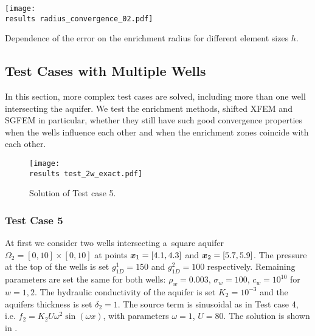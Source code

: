 \begin{graph}[!htb]
  \centering    
  \texttt{[image: \\results radius\_convergence\_02.pdf]}
  \caption[Optimal enrichment radius.]{Dependence of the error on the enrichment radius for different
  element sizes $h$.}
  \label{graph:radius_conv_2}
\end{graph}


\subsection{Test Cases with Multiple Wells}
\label{sec:2d_results_multiple}
In this section, more complex test cases are solved, including more than one well intersecting the aquifer.
We test the enrichment methods, shifted XFEM and SGFEM in particular, whether they
still have such good convergence properties when the wells influence each other and when the enrichment zones coincide with each other.

%
\begin{figure}[!htb]
  \centering    
    \texttt{[image: \\results test\_2w\_exact.pdf]}
  \caption{Solution of Test case 5.}
  \label{fig:test_2w_exact}
\end{figure}
\subsubsection{Test Case 5}
At first we consider two wells intersecting a~square aquifer $\Omega_2 = [0,10]\times[0, 10]$ at points $\mathbf{\boldsymbol{x}}_1 = [4.1, 4.3]$ and $\mathbf{\boldsymbol{x}}_2 = [5.7, 5.9]$.
The pressure at the top of the wells is set $g^1_{1D}=150$ and $g^2_{1D}=100$ respectively.
Remaining parameters are set the same for both wells: $\rho_w = 0.003$, $\sigma_w = 100$, $c_w = 10^{10}$ for $w=1,2$.
The hydraulic conductivity of the aquifer is set $K_2=10^{-3}$ and the aquifers thickness is set $\delta_2=1$.
The source term is sinusoidal as in Test case 4, i.e. $f_2 = K_2U\omega^2\sin(\omega x)$, with parameters $\omega=1$, $U=80$.
The solution is shown in .

